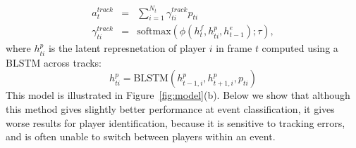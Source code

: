 \begin{eqnarray} 
\label{eq:track}
  a_t^{track} & = & \sum_{i=1}^{N_t} \gamma_{ti}^{track} p_{ti} 
\\ \nonumber
  \gamma_{ti}^{track} & = & \text{softmax} \left(\phi\left(h^f_t, h^p_{ti}, h^e_{t-1}\right); \tau\right),
\end{eqnarray}
where $h_{ti}^p$ is the latent represnetation of player $i$ in frame
$t$ computed using a BLSTM across tracks:
\[
  h_{ti}^p = \mbox{BLSTM}(h_{t-1,i}^p, h_{t+1,i}^p, p_{ti})
\]
This model is illustrated in Figure~\ref{fig:model}(b).
Below  we show that although this method gives slightly better
performance at event classification, it gives worse results for player
identification, because it is sensitive to tracking errors, and
is often unable to switch between players within an event.



